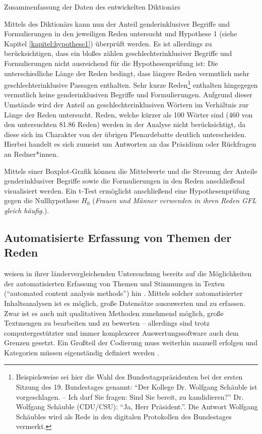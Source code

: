 \documentclass[12pt, 
    twoside=false, 
    bibliography=totoc, 
    numbers=endperiod, 
    headings=normal, 
    toc=chapterentrydotfill
    ]{scrbook}
\begin{document}
\begin{table}[htb]
    \centering
    \caption[Zusammenfassung der Daten des entwickelten Diktionärs]{Zusammenfassung der Daten des entwickelten Diktionärs}
    
    \label{table:zusammenfassung_dict}
\end{table}

Mittels des Diktionärs kann nun der Anteil genderinklusiver Begriffe und Formulierungen in den jeweiligen Reden untersucht und Hypothese 1 (siehe Kapitel \ref{kapitel:hypothese1}) überprüft werden. Es ist allerdings zu berücksichtigen, dass ein bloßes zählen geschlechterinklusiver Begriffe und Formulierungen nicht ausreichend für die Hypothesenprüfung ist:
Die unterschiedliche Länge der Reden bedingt, dass längere Reden vermutlich mehr geschlechterinklusive Passagen enthalten. Sehr kurze Reden\footnote{Beispielsweise sei hier die Wahl des Bundestagspräsidenten bei der ersten Sitzung des 19. Bundestages genannt: \enquote{Der Kollege Dr. Wolfgang Schäuble ist vorgeschlagen. -- Ich darf Sie fragen: Sind Sie bereit, zu kandidieren?} Dr. Wolfgang Schäuble (CDU/CSU): \enquote{Ja, Herr Präsident.}. Die Antwort Wolfgang Schäubles wird als Rede in den digitalen Protokollen des Bundestages vermerkt.} enthalten hingegegen vermutlich keine genderinklusiven Begriffe und Formulierungen. Aufgrund dieser Umstände wird der Anteil an geschlechterinklusiven Wörtern im Verhältnis zur Länge der Reden untersucht. 
Reden, welche kürzer als 100 Wörter sind (460 von den untersuchten 81.86 Reden) werden in der Analyse nicht berücksichtigt, da diese sich im Charakter von der übrigen Plenardebatte deutlich unterscheiden. Hierbei handelt es sich zumeist um Antworten an das Präsidium oder Rückfragen an Redner*innen.

Mittels einer Boxplot-Grafik können die Mittelwerte und die Streuung der Anteile genderinklusiver Begriffe sowie die Formulierungen in den Reden anschließend visualisiert werden. Ein t-Test \parencite[vgl.][164ff.]{diaz-bone_2018} ermöglicht anschließend eine Hypothesenprüfung gegen die Nullhypothese $H_0$ (\emph{Frauen und Männer verwenden in ihren Reden GFL gleich häufig.}).

\subsection{Automatisierte Erfassung von Themen der Reden} \label{kapitel:methode_inhalte}

\citeauthor{back_2018} weisen in ihrer ländervergleichenden Untersuchung bereits auf die Möglichkeiten der automatisierten Erfassung von Themen und Stimmungen in Texten (\enquote{automated
content analysis methods}) hin \parencite*[18]{back_2018}. Mittels solcher automatisierter Inhaltsanalysen ist es möglich, große Datensätze auszuwerten und zu erfassen. Zwar ist es auch mit qualitativen Methoden zunehmend möglich, große Textmengen zu bearbeiten und zu bewerten \parencite[vgl.][]{raediker_2019} -- allerdings sind trotz computergestützter und immer komplexerer Auswertungssoftware auch dem Grenzen gesetzt. Ein Großteil der Codierung muss weiterhin manuell erfolgen und Kategorien müssen eigenständig definiert werden \parencite[52f.]{raediker_2019}. 
\end{document}
